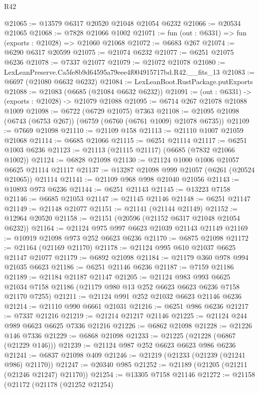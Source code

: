 \begin{lexlean}{R42}
\begin{coremodule}
{@21065 := @13579 @6317 @20520 @21048 @21054 @6232
@21066 := @20534 @21065
@21068 := @7828 @21066 @1002
@21071 := fun (out : @6331) => fun (exports : @21028) => @21060 @21068
@21072 := @6683 @267
@21074 := @6290 @6317 @20599
@21075 := @21074 @6232
@21077 := @6251 @21075 @6236
@21078 := @7337 @21077
@21079 := @21072 @21078
@21080 := LexLeanPreserve.Ca5fe8b9d64595a79eee4f004915717bd.R42.__fits_13
@21083 := @6697 (@21080 @6632 @6232)
@21084 := LexLeanBoot.RustPackage.putExports
@21088 := @21083 (@6685 (@21084 @6632 @6232))
@21091 := (out : @6331) -> (exports : @21028) -> @21079 @21088
@21095 := @6714 @267 @21078 @21088 @1009
@21098 := @6722 (@6729 @21075) @7363
@21108 := @21095 @21098 (@6743 (@6753 @267)) (@6759 (@6760 (@6761 @1009) @21078 @6735))
@21109 := @7669 @21098
@21110 := @21109 @158
@21113 := @21110 @1007 @21059 @21068
@21114 := @6685 @21066
@21115 := @6251 @21114
@21117 := @6251 @1003 @6236
@21123 := @21113 (@21115 @21117) (@6685 (@7832 @21066 @1002))
@21124 := @6828 @21098
@21130 := @21124 @1000 @1006 @21057 @6625 @21114 @21117
@21137 := @13287 @21098 @999 @21057 (@6261 (@20524 @21065)) @21114
@21141 := @21109 @968 @998 @21040 @21056
@21143 := @10893 @973 @6236
@21144 := @6251 @21143
@21145 := @13223 @7158
@21146 := @6685 @21053
@21147 := @21145 @21146
@21148 := @6251 @21147
@21149 := @21148 @21077
@21151 := @21141 (@21144 @21149)
@21152 := @12964 @20520
@21158 := @21151 (@20596 (@21152 @6317 @21048 @21054 @6232))
@21164 := @21124 @975 @997 @6623 @21039 @21143 @21149
@21169 := @10919 @21098 @973 @252 @6623 @6236
@21170 := @6875 @21098
@21172 := @21164 (@21169 @21170)
@21178 := @21124 @995 @610 @21037 @6625 @21147 @21077
@21179 := @6892 @21098
@21184 := @21179 @360 @978 @994 @21035 @6623
@21186 := @6251 @21146 @6236
@21187 := @7159 @21186
@21189 := @21184 @21187 @21147
@21205 := @21124
    @983
    @993
    @6625
    @21034
    @7158
    @21186
    (@21179 @980 @13 @252 @6623 @6623 @6236 @7158 @21170 @7255)
@21211 := @21124 @991 @252 @21032 @6623 @21146 @6236
@21214 := @21110 @990 @6661 @21031
@21216 := @6251 @986 @6236
@21217 := @7337 @21216
@21219 := @21214 @21217 @21146
@21225 := @21124 @244 @989 @6623 @6625 @7336 @21216
@21226 := @6862 @21098
@21228 := @21226 @146 @7336
@21229 := @6868 @21098
@21233 := @21225 (@21228 (@6867 (@21229 @146)))
@21239 := @21124 @987 @252 @6623 @6623 @986 @6236
@21241 := @6837 @21098 @409
@21246 := @21219 (@21233 (@21239 (@21241 @986) @21170))
@21247 := @20340 @985
@21252 := @21189 (@21205 (@21211 (@21246 @21247) @21170))
@21254 := @13305 @7158 @21146
@21272 := @21158
    (@21172
      (@21178
        (@21252 @21254)
}
\end{coremodule}
\end{lexlean}
